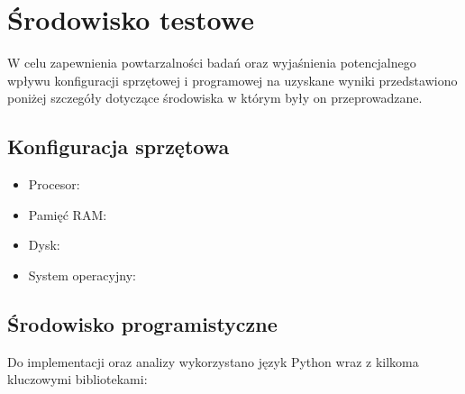 \section{Środowisko testowe}

W celu zapewnienia powtarzalności badań oraz wyjaśnienia potencjalnego wpływu konfiguracji sprzętowej i programowej na uzyskane wyniki przedstawiono poniżej szczegóły dotyczące środowiska w którym były on przeprowadzane.

\subsection{Konfiguracja sprzętowa}
\begin{itemize}
    \item Procesor: 
    \item Pamięć RAM: 
    \item Dysk: 
    \item System operacyjny: 
\end{itemize}

\subsection{Środowisko programistyczne}

Do implementacji oraz analizy wykorzystano język Python wraz z kilkoma kluczowymi bibliotekami:

